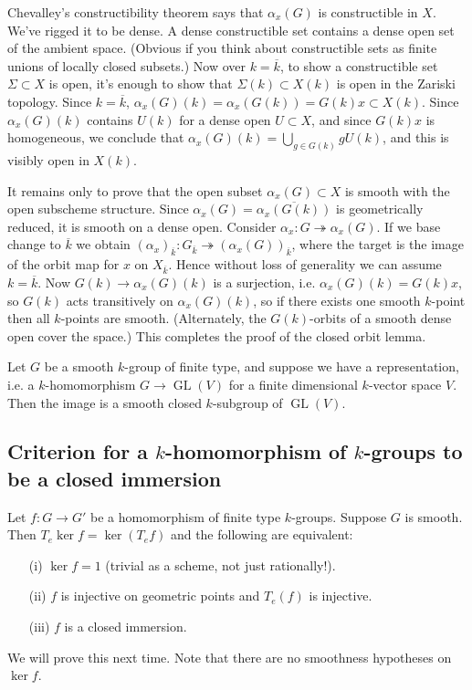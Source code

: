 \documentclass[10pt]{article}
\newcommand{\GL}{\operatorname{GL}}
\renewcommand{\(}{\left(}
\renewcommand{\)}{\right)}
\renewcommand{\bar}{\overline}
\newcommand{\onto}{\twoheadrightarrow }
\numberwithin{thm}{subsection}
\begin{document}
Chevalley's constructibility theorem says that $\alpha_x(G)$ is constructible in $X$.
We've rigged it to be dense.
A dense constructible set contains a dense open set of the ambient space.
(Obvious if you think about constructible sets
as finite unions of locally closed subsets.)
Now over $k=\bar k$, to show a constructible set $\Sigma\subset X$ is open, it's enough to show that $\Sigma(k)\subset X(k)$ is open in the Zariski topology.
Since $k=\bar k$, $\alpha_x(G)(k)=\alpha_x(G(k))=G(k)x\subset X(k)$.
Since $\alpha_x(G)(k)$ contains $U(k)$ for a dense open $U \subset X$, 
and since $G(k)x$ is homogeneous,
we conclude that $\alpha_x(G)(k)=\bigcup_{g\in G(k)}gU(k)$,
and this is visibly open in $X(k)$.

It remains only to prove that the open subset 
$\alpha_x(G)\subset X$ is smooth with the open subscheme structure.
Since $\alpha_x(G)=\bar{\alpha_x(G(k))}$ is geometrically reduced, it is smooth on a dense open.
Consider $\alpha_x:G\onto \alpha_x(G)$.
If we base change to $\bar k$
we obtain $(\alpha_x)_{\bar k}:G_{\bar k}\onto (\alpha_x(G))_{\bar k}$,
where the target is the image of the orbit map for $x$ on $X_{\bar k}$.
Hence without loss of generality we can assume $k=\bar k$.
Now $G(k)\to \alpha_x(G)(k)$ is a surjection,
i.e. $\alpha_x(G)(k)=G(k)x$,
so $G(k)$ acts transitively on $\alpha_x(G)(k)$,
so if there exists one smooth $k$-point then all $k$-points are smooth.
(Alternately, the $G(k)$-orbits of a smooth dense open cover the space.)
This completes the proof of the closed orbit lemma.
\begin{ex}Let $G$ be a smooth $k$-group of finite type,
and suppose we have a representation,
i.e. a $k$-homomorphism $G\to \GL(V)$ for a finite dimensional $k$-vector space $V$. Then the image is a smooth closed $k$-subgroup of $\GL(V)$.
\end{ex}
\subsection{Criterion for a $k$-homomorphism of $k$-groups to be a closed immersion}
\begin{prop}\label{khomclosed}
Let $f:G\to G'$ be a homomorphism of finite type $k$-groups.
Suppose $G$ is smooth.
Then $T_e\ker f = \ker (T_ef)$
and the following are equivalent:
\begin{itemize}
\item[(i)] $\ker f = 1$ (trivial as a scheme, not just rationally!).
\item[(ii)]$f$ is injective on geometric points and $T_e(f)$ is injective.
\item[(iii)] $f$ is a closed immersion.
\end{itemize}
\end{prop}
We will prove this next time.  Note that there are no smoothness hypotheses 
on $\ker f$.
\end{document}

